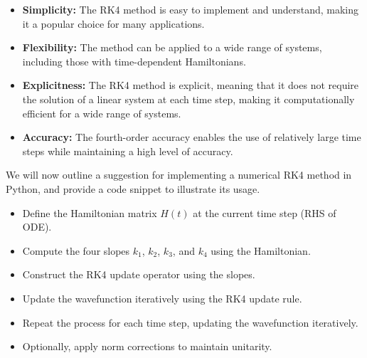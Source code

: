 \documentclass{subfiles}
\begin{document}
\begin{itemize}
    \item \textbf{Simplicity:} The RK4 method is easy to implement and understand, making it a popular choice for many applications.
    \item \textbf{Flexibility:} The method can be applied to a wide range of systems, including those with time-dependent Hamiltonians.
    \item \textbf{Explicitness:} The RK4 method is explicit, meaning that it does not require the solution of a linear system at each time step, making it computationally efficient for a wide range of systems.
    \item \textbf{Accuracy:} The fourth-order accuracy enables the use of relatively large time steps while maintaining a high level of accuracy.
\end{itemize}
We will now outline a suggestion for implementing a numerical RK4 method in Python, and provide a code snippet to illustrate its usage. 
\begin{itemize}
    \item Define the Hamiltonian matrix $H(t)$ at the current time step (RHS of ODE).
    \item Compute the four slopes $k_1$, $k_2$, $k_3$, and $k_4$ using the Hamiltonian.
    \item Construct the RK4 update operator using the slopes.
    \item Update the wavefunction iteratively using the RK4 update rule.
    \item Repeat the process for each time step, updating the wavefunction iteratively.
    \item Optionally, apply norm corrections to maintain unitarity.
\end{itemize}
\end{document}
